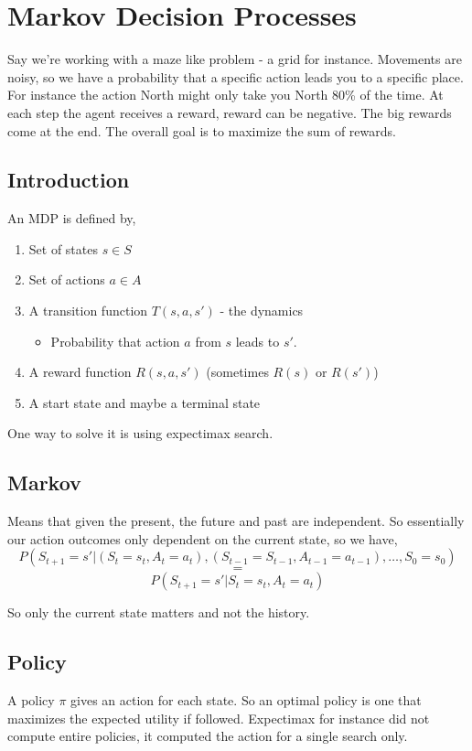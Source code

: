 \chapter{Markov Decision Processes}

Say we're working with a maze like problem - a grid for instance. Movements are noisy, so we have a probability that a specific action leads you to a specific place. For instance the action North might only take you North 80\% of the time. At each step the agent receives a reward, reward can be negative. The big rewards come at the end. The overall goal is to maximize the sum of rewards.


\section{Introduction}
An MDP is defined by, 
\begin{enumerate}
    \item Set of states $s \in S$
    \item Set of actions  $a \in A$
    \item A transition function  $T(s, a, s')$ - the dynamics
        \begin{itemize}
            \item Probability that action $a$ from $s$ leads to $s'$.
        \end{itemize}
    \item A reward function $R(s, a, s')$ (sometimes $R(s)$ or  $R(s')$)
    \item  A start state and maybe a terminal state
\end{enumerate}


One way to solve it is using expectimax search.


\section{Markov}
Means that given the present, the future and past are independent. So essentially our action outcomes only dependent on the current state, so we have, 
$$ P(S_{t + 1} = s' | (S_t = s_t, A_t = a_t), (S_{t - 1} = S_{t - 1}, A_{t - 1} = a_{t - 1}), \dots, S_0 = s_0) $$ 
$$ = $$ 
$$ P(S_{t + 1} = s'| S_t = s_t , A_t = a_t) $$ 

So only the current state matters and not the history.

\section{Policy}
A policy $\pi$ gives an action for each state. So an optimal policy is one that maximizes the expected utility if followed. Expectimax for instance did not compute entire policies, it computed the action for a single search only.


